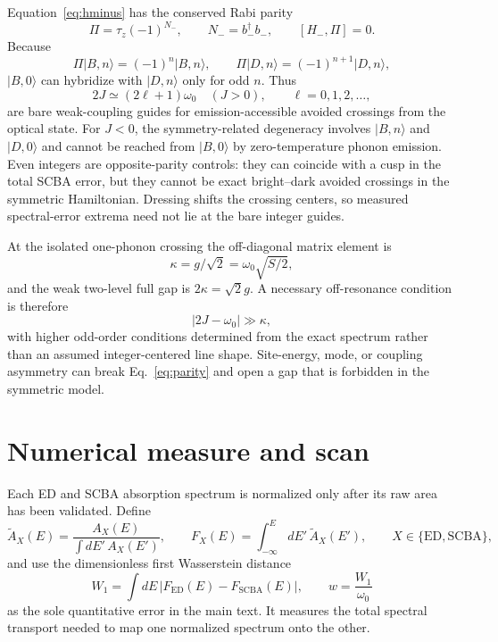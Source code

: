 \documentclass[11pt]{article}
\newcommand{\ket}[1]{\lvert #1\rangle}
\newcommand{\SCBA}{\mathrm{SCBA}}
\newcommand{\ED}{\mathrm{ED}}
\begin{document}
Equation~\eqref{eq:hminus} has the conserved Rabi parity
\begin{equation}
 \Pi=\tau_z(-1)^{N_-},\qquad N_-=b_-^\dagger b_-,\qquad [H_-,\Pi]=0.
\label{eq:parity}
\end{equation}
Because
\begin{equation}
 \Pi\ket{B,n}=(-1)^n\ket{B,n},\qquad
 \Pi\ket{D,n}=(-1)^{n+1}\ket{D,n},
\end{equation}
$\ket{B,0}$ can hybridize with $\ket{D,n}$ only for odd $n$.  Thus
\begin{equation}
 2J\simeq(2\ell+1)\omega_0\quad(J>0),\qquad \ell=0,1,2,\ldots,
\label{eq:oddguide}
\end{equation}
are bare weak-coupling guides for emission-accessible avoided crossings from
the optical state.  For $J<0$, the symmetry-related degeneracy involves
$\ket{B,n}$ and $\ket{D,0}$ and cannot be reached from $\ket{B,0}$ by
zero-temperature phonon emission.  Even integers are opposite-parity
controls: they can coincide with a cusp in the total SCBA error, but they
cannot be exact bright--dark avoided crossings in the symmetric Hamiltonian.
Dressing shifts the crossing centers, so measured spectral-error extrema need
not lie at the bare integer guides.

At the isolated one-phonon crossing the off-diagonal matrix element is
\begin{equation}
 \kappa=g/\sqrt2=\omega_0\sqrt{S/2},
\end{equation}
and the weak two-level full gap is $2\kappa=\sqrt2g$.  A necessary
off-resonance condition is therefore
\begin{equation}
 |2J-\omega_0|\gg \kappa,
\label{eq:detune}
\end{equation}
with higher odd-order conditions determined from the exact spectrum rather
than an assumed integer-centered line shape.  Site-energy, mode, or coupling
asymmetry can break Eq.~\eqref{eq:parity} and open a gap that is forbidden in
the symmetric model.

\section{Numerical measure and scan}

Each ED and SCBA absorption spectrum is normalized only after its raw area has
been validated.  Define
\begin{equation}
 \widetilde A_X(E)=\frac{A_X(E)}{\int dE'\,A_X(E')},\qquad
 F_X(E)=\int_{-\infty}^{E}dE'\,\widetilde A_X(E'),
 \qquad X\in\{\ED,\SCBA\},
\end{equation}
and use the dimensionless first Wasserstein distance
\begin{equation}
 W_1=\int dE\,\left|F_{\ED}(E)-F_{\SCBA}(E)\right|,
 \qquad w=\frac{W_1}{\omega_0}
\label{eq:wasserstein}
\end{equation}
as the sole quantitative error in the main text.  It measures the total
spectral transport needed to map one normalized spectrum onto the other.
\end{document}
